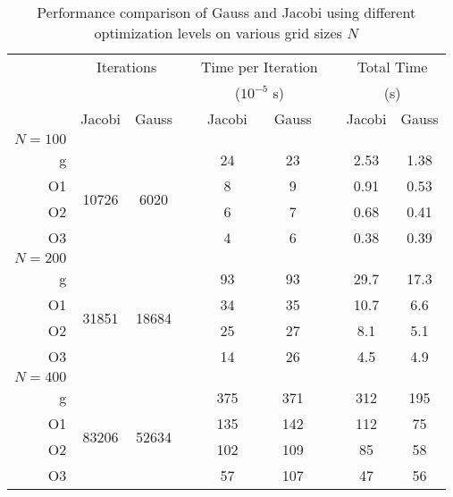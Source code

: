 \newcommand{\mct}[1]{\multicolumn{2}{c}{#1}}
\newcommand{\pht}{\phantom{}}
\newcommand{\mrt}[1]{\multirow{4}{*}{#1}}
\begin{table}[H]
\caption{Performance comparison of Gauss and Jacobi using different
optimization levels on various grid sizes $N$}
\label{tab:performance}
\centering
\begin{tabular}{@{}r cc c cc c cc @{}}
    \toprule
    & \mct{Iterations} & \pht & \mct{Time per Iteration} & \pht & \mct{Total Time}\\
    &         &        & \pht & \mct{($10^{-5}$ s)}        & \pht & \mct{(s)}       \\
    \cmidrule{2-3} \cmidrule{5-6} \cmidrule {8-9}
     & Jacobi & Gauss && Jacobi & Gauss && Jacobi & Gauss\\
    \midrule

$N = 100$\\
     g & \mrt{10726} & \mrt{6020} && 24 & 23 &&  2.53 &  1.38 \\
    O1 &  &  && 8 & 9 &&  0.91 &  0.53 \\
    O2 &  &  && 6 & 7 &&  0.68 &  0.41 \\
    O3 &  &  && 4 & 6 &&  0.38 &  0.39 \\
$N = 200$\\
     g & \mrt{31851} & \mrt{18684} && 93 & 93 &&  29.7 &  17.3 \\
    O1 &  &  && 34 & 35 &&  10.7 &   6.6 \\
    O2 &  &  && 25 & 27 &&   8.1 &   5.1 \\
    O3 &  &  && 14 & 26 &&   4.5 &   4.9 \\
$N = 400$\\
     g & \mrt{83206} & \mrt{52634} && 375 & 371 &&   312 &   195 \\
    O1 &  &  && 135 & 142 &&   112 &    75 \\
    O2 &  &  && 102 & 109 &&    85 &    58 \\
    O3 &  &  && 57 & 107 &&    47 &    56 \\

    \bottomrule
\end{tabular}
\end{table}
